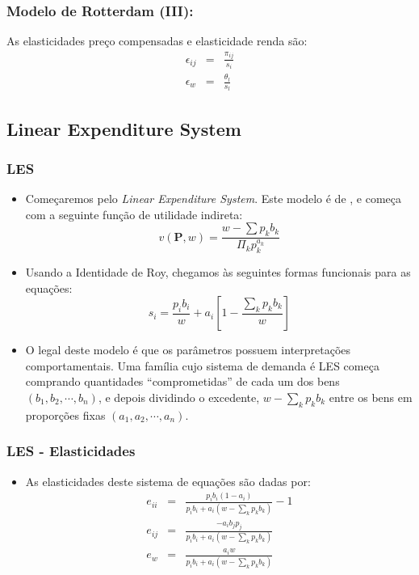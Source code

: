 \documentclass{beamer}
\begin{document}
\begin{frame}\frametitle{Modelo de Rotterdam (III):}

As elasticidades preço compensadas e elasticidade renda são:
\begin{eqnarray*}
\epsilon_{ij} & = & \frac{\pi_{ij}}{s_{i}}\\
\epsilon_{w} & = & \frac{\theta_{l}}{s_{l}}
\end{eqnarray*}

\end{frame}

\subsection{Linear Expenditure System}
%
\begin{frame}\frametitle{LES}

\begin{itemize}
\small
\item Começaremos pelo \emph{Linear Expenditure System}. Este modelo é de
\citet{Klein1947}, e começa com a seguinte
função de utilidade indireta:
\[
v(\mathbf{P},w)=\frac{w-\sum p_{k}b_{k}}{\Pi_{k}p_{k}^{a_{k}}}
\]
\item Usando a Identidade de Roy, chegamos às seguintes formas funcionais
para as equações:
\[
s_{i}=\frac{p_{i}b_{i}}{w}+a_{i}\left[1-\frac{\sum_{k}p_{k}b_{k}}{w}\right]
\]
\item O legal deste modelo é que os parâmetros possuem interpretações comportamentais.
Uma família cujo sistema de demanda é LES começa comprando quantidades
``comprometidas'' de cada um dos bens $(b_{1},b_{2},\cdots,b_{n})$,
e depois dividindo o excedente, $w-\sum_{k}p_{k}b_{k}$ entre os bens
em proporções fixas $(a_{1},a_{2},\cdots,a_{n})$. 
\end{itemize}
\end{frame}

\begin{frame}\frametitle{LES - Elasticidades}

\begin{itemize}
\item As elasticidades deste sistema de equações são dadas por:
\begin{eqnarray*}
e_{ii} & = & \frac{p_{i}b_{i}(1-a_{i})}{p_{i}b_{i}+a_{i}\left(w-\sum_{k}p_{k}b_{k}\right)}-1\\
e_{ij} & = & \frac{-a_{i}b_{j}p_{j}}{p_{i}b_{i}+a_{i}\left(w-\sum_{k}p_{k}b_{k}\right)}\\
e_{w} & = & \frac{a_{i}w}{p_{i}b_{i}+a_{i}\left(w-\sum_{k}p_{k}b_{k}\right)}
\end{eqnarray*}
\end{itemize}
\end{frame}
\end{document}
